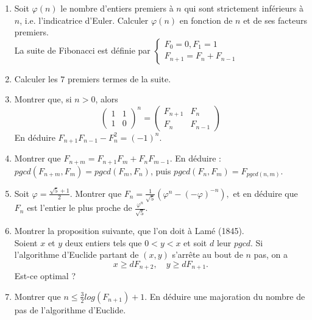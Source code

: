 \begin{enumerate}
\item Soit $\varphi(n)$ le nombre d'entiers premiers à $n$ qui sont strictement inférieurs à $n$, i.e. l'indicatrice d'Euler. Calculer $\varphi(n)$ en fonction de $n$ et de ses facteurs premiers.\\

La suite de Fibonacci est définie par 
$\left\{\begin{array}{c} F_0 = 0, F_1 = 1\\
F_{n+1}=F_n+F_{n-1}\end{array}\right.$

\item Calculer les $7$ premiers termes de la suite.
\item Montrer que, si $n>0$, alors 
\[\begin{pmatrix}1 & 1 \\ 1 & 0\end{pmatrix}^n = \begin{pmatrix}F_{n+1} & F_n \\ F_n & F_{n-1}\end{pmatrix}\]
En déduire $F_{n+1}F_{n-1}-F_n^2 = (-1)^n$.
\item Montrer que $F_{n+m} = F_{n+1}F_m+F_n F_{m-1}$. En déduire : $pgcd(F_{n+m},F_m)= pgcd(F_m,F_n)$, puis $pgcd(F_n,F_m)=F_{pgcd(n,m)}$.
\item Soit $\varphi = \frac{\sqrt{5}+1}{2}$. Montrer que 
$F_n= \frac{1}{\sqrt{5}}(\varphi^n-(-\varphi)^{-n}),$
et en déduire que $F_n$ est l'entier le plus proche de $\frac{\varphi^n}{\sqrt 5}$.
\item Montrer la proposition suivante, que l'on doit à Lamé (1845). \\
Soient $x$ et $y$ deux entiers tels que $0<y<x$ et soit $d$ leur $pgcd$. Si l'algorithme d'Euclide partant de $(x,y)$ s'arrête au bout de $n$ pas, on a 
\[x \geq d F_{n+2}, \quad y \geq d F_{n+1}.\]
Est-ce optimal ?
\item Montrer que $n\leq \frac{3}{2} log (F_{n+1})+1$. En déduire une majoration du nombre de pas de l'algorithme d'Euclide.\\


\end{enumerate}
